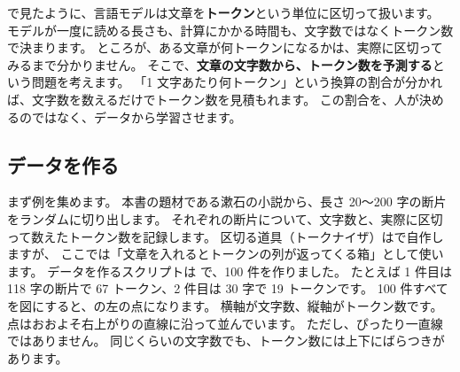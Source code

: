 で見たように、言語モデルは文章を\textbf{トークン}という単位に区切って扱います。
モデルが一度に読める長さも、計算にかかる時間も、文字数ではなくトークン数で決まります。
ところが、ある文章が何トークンになるかは、実際に区切ってみるまで分かりません。
そこで、\textbf{文章の文字数から、トークン数を予測する}という問題を考えます。
「1 文字あたり何トークン」という換算の割合が分かれば、文字数を数えるだけでトークン数を見積もれます。
この割合を、人が決めるのではなく、データから学習させます。

\subsection*{データを作る}

まず例を集めます。
本書の題材である漱石の小説から、長さ 20〜200 字の断片をランダムに切り出します。
それぞれの断片について、文字数と、実際に区切って数えたトークン数を記録します。
区切る道具（トークナイザ）はで自作しますが、
ここでは「文章を入れるとトークンの列が返ってくる箱」として使います。
データを作るスクリプトは  で、100 件を作りました。
たとえば 1 件目は 118 字の断片で 67 トークン、2 件目は 30 字で 19 トークンです。
100 件すべてを図にすると、の左の点になります。
横軸が文字数、縦軸がトークン数です。
点はおおよそ右上がりの直線に沿って並んでいます。
ただし、ぴったり一直線ではありません。
同じくらいの文字数でも、トークン数には上下にばらつきがあります。

